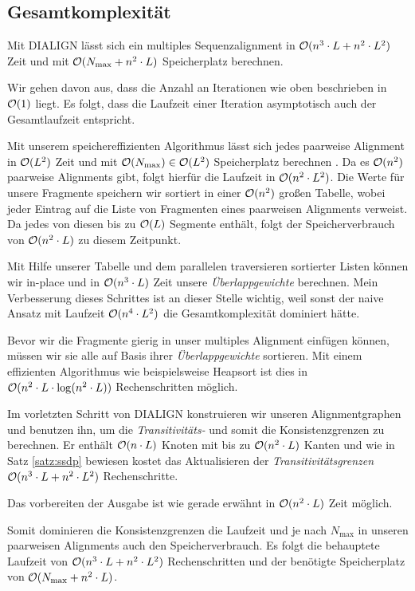 \subsection{Gesamtkomplexität}

\begin{korollar}
	Mit DIALIGN	lässt sich ein multiples Sequenzalignment in $\mathcal{O}(n^3\cdot L + n^2\cdot L^2)$ Zeit und mit $\mathcal{O}(N_{\max} + n^2\cdot L)$ Speicherplatz berechnen.
\end{korollar}

\begin{beweis}
	Wir gehen davon aus, dass die Anzahl an Iterationen wie oben beschrieben in $\mathcal{O}(1)$ liegt. Es folgt, dass die Laufzeit einer Iteration asymptotisch auch der Gesamtlaufzeit entspricht. 
	
	Mit unserem speichereffizienten Algorithmus lässt sich jedes paarweise Alignment in $\mathcal{O}(L^2)$ Zeit und mit $\mathcal{O}(N_{\max}) \in \mathcal{O}(L^2)$ Speicherplatz berechnen \citep{m02}. Da es $\mathcal{O}(n^2)$ paarweise Alignments gibt, folgt hierfür die Laufzeit in $\mathcal{O}(n^2\cdot L^2)$. Die Werte für unsere Fragmente speichern wir sortiert in einer $\mathcal{O}(n^2)$ großen Tabelle, wobei jeder Eintrag auf die Liste von Fragmenten eines paarweisen Alignments verweist. Da jedes von diesen bis zu $\mathcal{O}(L)$ Segmente enthält, folgt der Speicherverbrauch von $\mathcal{O}(n^2\cdot L)$ zu diesem Zeitpunkt.
	
	Mit Hilfe unserer Tabelle und dem parallelen traversieren sortierter Listen können wir in-place und in $\mathcal{O}(n^3\cdot L)$ Zeit unsere \emph{Überlappgewichte} berechnen. Mein Verbesserung dieses Schrittes ist an dieser Stelle wichtig, weil sonst der naive Ansatz mit Laufzeit $\mathcal{O}(n^4\cdot L^2)$ die Gesamtkomplexität dominiert hätte.
	
	Bevor wir die Fragmente gierig in unser multiples Alignment einfügen können, müssen wir sie alle auf Basis ihrer \emph{Überlappgewichte} sortieren. Mit einem effizienten Algorithmus wie beispielsweise Heapsort ist dies in $\mathcal{O}(n^2\cdot L\cdot \log(n^2\cdot L))$ Rechenschritten möglich. 
	
	Im vorletzten Schritt von DIALIGN konstruieren wir unseren Alignmentgraphen und benutzen ihn, um die \emph{Transitivitäts-} und somit die Konsistenzgrenzen zu berechnen. Er enthält $\mathcal{O}(n\cdot L)$ Knoten mit bis zu $\mathcal{O}(n^2\cdot L)$ Kanten und wie in Satz \ref{satz:ssdp} bewiesen kostet das Aktualisieren der \emph{Transitivitätsgrenzen} $\mathcal{O}(n^3\cdot L + n^2\cdot L^2)$ Rechenschritte. 
	
	Das vorbereiten der Ausgabe ist wie gerade erwähnt in $\mathcal{O}(n^2\cdot L)$ Zeit möglich.
	
	Somit dominieren die Konsistenzgrenzen die Laufzeit und je nach $N_{\max}$ in unseren paarweisen Alignments auch den Speicherverbrauch. Es folgt die behauptete Laufzeit von $\mathcal{O}(n^3\cdot L + n^2\cdot L^2)$ Rechenschritten und der benötigte Speicherplatz von $\mathcal{O}(N_{\max} + n^2\cdot L)$. 
\end{beweis}

